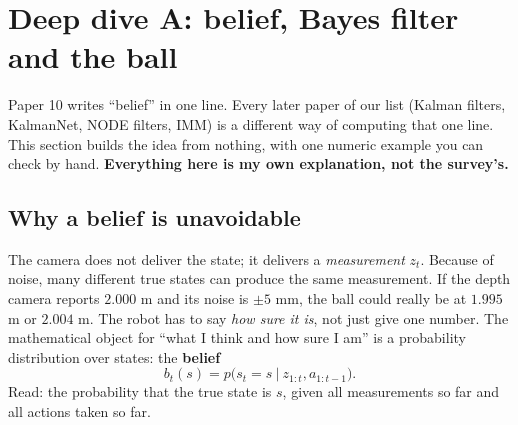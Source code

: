 \documentclass[11pt,a4paper]{article}
\begin{document}
\section{Deep dive A: belief, Bayes filter and the ball}

\begin{idea}
Paper 10 writes ``belief'' in one line. Every later paper of our list (Kalman filters,
KalmanNet, NODE filters, IMM) is a different way of computing that one line. This section builds
the idea from nothing, with one numeric example you can check by hand. \textbf{Everything here is
my own explanation, not the survey's.}
\end{idea}

\subsection{Why a belief is unavoidable}
The camera does not deliver the state; it delivers a \emph{measurement} $z_t$. Because of noise,
many different true states can produce the same measurement. If the depth camera reports
$2.000$ m and its noise is $\pm 5$ mm, the ball could really be at $1.995$ m or $2.004$ m. The
robot has to say \emph{how sure it is}, not just give one number. The mathematical object for
``what I think and how sure I am'' is a probability distribution over states: the \textbf{belief}
\[
b_t(s)=p\big(s_t=s\ \big|\ z_{1:t},a_{1:t-1}\big).
\]
Read: the probability that the true state is $s$, given all measurements so far and all actions
taken so far.
\end{document}
